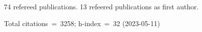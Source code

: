 74 refereed publications. 13 refeered publications as first author.

Total citations~=~3258; h-index~=~32 (2023-05-11)